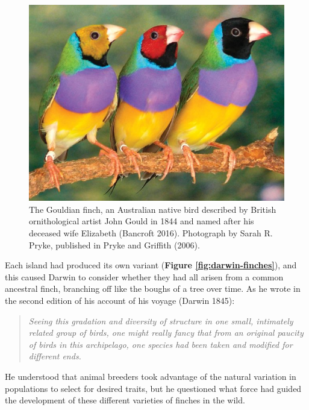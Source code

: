 \documentclass[
]{book}
\begin{document}
\begin{figure}

{\centering \includegraphics[width=1\linewidth]{figs/introduction/gouldian_finch} 

}

\caption{The Gouldian finch, an Australian native bird described by British ornithological artist John Gould in 1844 and named after his deceased wife Elizabeth (Bancroft 2016). Photograph by Sarah R. Pryke, published in Pryke and Griffith (2006).}\label{fig:gouldian-finch}
\end{figure}

Each island had produced its own variant (\textbf{Figure \ref{fig:darwin-finches}}), and this caused Darwin to consider whether they had all arisen from a common ancestral finch, branching off like the boughs of a tree over time. As he wrote in the second edition of his account of his voyage (Darwin 1845):

\begin{quote}
\emph{Seeing this gradation and diversity of structure in one small, intimately related group of birds, one might really fancy that from an original paucity of birds in this archipelago, one species had been taken and modified for different ends.}
\end{quote}

He understood that animal breeders took advantage of the natural variation in populations to select for desired traits, but he questioned what force had guided the development of these different varieties of finches in the wild.
\end{document}
